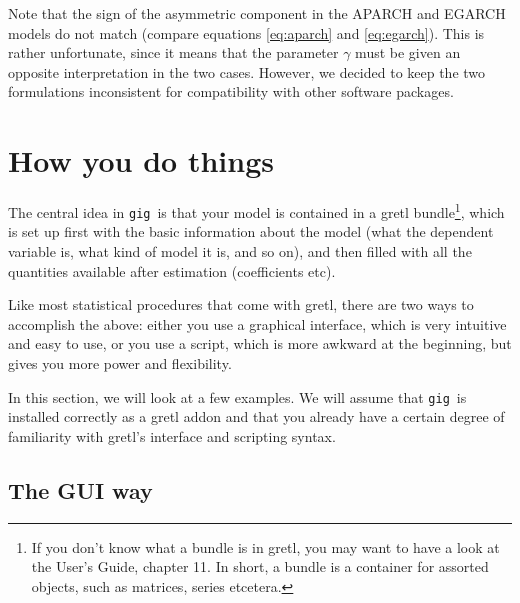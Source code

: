\documentclass[a4paper,11pt]{article}
\newcommand{\app}[1]{\textsf{#1}}
\newcounter{script}[section]
\newcommand{\uhat}{\ensuremath u}
\newcommand{\gig}{\texttt{gig}}
\begin{document}
Note that the sign of the asymmetric component in the APARCH and
EGARCH models do not match (compare equations \eqref{eq:aparch} and
\eqref{eq:egarch}). This is rather unfortunate, since it means that
the parameter $\gamma$ must be given an opposite interpretation in the
two cases. However, we decided to keep the two formulations
inconsistent for compatibility with other software packages.




\section{How you do things}

The central idea in \gig\ is that your model is contained in a
\app{gretl} bundle\footnote{If you don't know what a bundle is in
  \app{gretl}, you may want to have a look at the User's Guide,
  chapter 11. In short, a bundle is a container for assorted objects,
  such as matrices, series etcetera.}, which is set up first with the
basic information about the model (what the dependent variable is,
what kind of model it is, and so on), and then filled with all the
quantities available after estimation (coefficients etc).

Like most statistical procedures that come with \app{gretl}, there are
two ways to accomplish the above: either you use a graphical
interface, which is very intuitive and easy to use, or you use a
script, which is more awkward at the beginning, but gives you more
power and flexibility.

In this section, we will look at a few examples. We will assume that
\gig\ is installed correctly as a \app{gretl} addon and that you
already have a certain degree of familiarity with \app{gretl}'s
interface and scripting syntax.


\subsection{The GUI way}
\label{sec:GUI}
\end{document}
